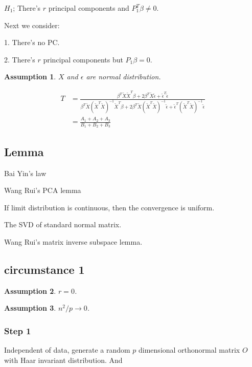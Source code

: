 \documentclass[review]{elsarticle}
\theoremstyle{plain}
\newtheorem{assumption}{\quad\quad Assumption}
\theoremstyle{definition}
\theoremstyle{remark}
\begin{document}
$H_1$; There's $r$ principal components and $P_1^T \beta \neq 0$.

Next we consider:

1. There's no PC.\@

2. There's $r$ principal components but $P_1\beta=0$.

\begin{assumption}\label{normal}
    $X$ and $\epsilon$ are normal distribution.
\end{assumption}


\begin{equation}
    \begin{aligned}
        T&=\frac{\beta^T \tilde{X}\tilde{X}^T \beta+
        2\beta^T \tilde{X}\tilde{\epsilon}+
        \tilde{\epsilon}^T\tilde{\epsilon}
    }{\beta^T \tilde{X}{(\tilde{X}^T\tilde{X})}^{-1}\tilde{X}^T \beta+
        2\beta^T \tilde{X}{(\tilde{X}^T\tilde{X})}^{-1}\tilde{\epsilon}+
        \tilde{\epsilon}^T{(\tilde{X}^T\tilde{X})}^{-1}\tilde{\epsilon}
    }\\
        &=\frac{A_1+A_2+A_3}{B_1+B_2+B_3}
    \end{aligned}
\end{equation}


\subsection{Lemma}

Bai Yin's law

Wang Rui's PCA lemma

If limit distribution is continuous, then the convergence is uniform.

The SVD of standard normal matrix.

Wang Rui's matrix inverse subspace lemma.

\subsection{circumstance 1}
\begin{assumption}
    $r=0$.
\end{assumption}
\begin{assumption}
    $n^2/p\to 0$.
\end{assumption}

\subsubsection{Step 1}
Independent of data, generate a random $p$ dimensional orthonormal matrix $O$ with Haar invariant distribution. And 
\end{document}
